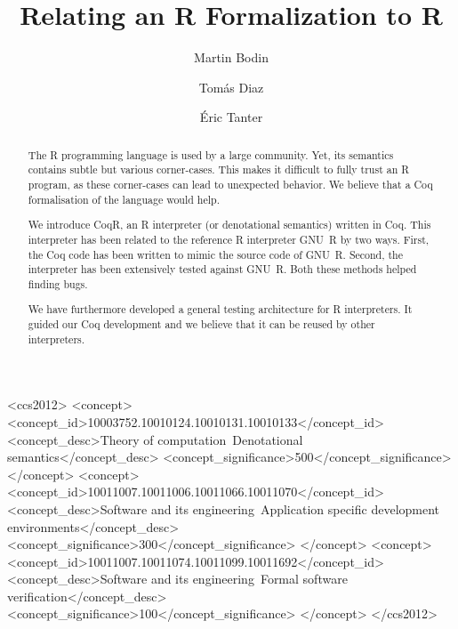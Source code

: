 \documentclass[
    sigplan,
    10pt,
    review, %
    natbib=false %
 ]{acmart}
\begin{document}
\title{Relating an R Formalization to R} %

\author{Martin Bodin}

\author{Tomás Diaz}

\author{Éric Tanter}

\begin{abstract}
    The R programming language is used by a large community.
    Yet, its semantics contains subtle but various corner-cases.
    This makes it difficult to fully trust an R program,
    as these corner-cases can lead to unexpected behavior.
    We believe that a Coq formalisation of the language would help.

    We introduce CoqR, an R interpreter (or denotational semantics) written in Coq.
    This interpreter has been related to the reference R interpreter
    GNU~R by two ways.
    First, the Coq code has been written to mimic the source code of GNU~R.
    Second, the interpreter has been extensively tested against GNU~R.
    Both these methods helped finding bugs.

    We have furthermore developed a general testing architecture
    for R interpreters.
    It guided our Coq development
    and we believe that it can be reused by other interpreters.
\end{abstract}

\begin{CCSXML}
  <ccs2012>
    <concept>
      <concept_id>10003752.10010124.10010131.10010133</concept_id>
      <concept_desc>Theory of computation~Denotational semantics</concept_desc>
      <concept_significance>500</concept_significance>
    </concept>
    <concept>
      <concept_id>10011007.10011006.10011066.10011070</concept_id>
      <concept_desc>Software and its engineering~Application specific development environments</concept_desc>
      <concept_significance>300</concept_significance>
    </concept>
    <concept>
      <concept_id>10011007.10011074.10011099.10011692</concept_id>
      <concept_desc>Software and its engineering~Formal software verification</concept_desc>
      <concept_significance>100</concept_significance>
    </concept>
  </ccs2012>
\end{CCSXML}
\end{document}
